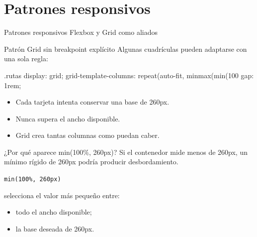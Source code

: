 \documentclass[aspectratio=169,11pt]{beamer}
\begin{document}
    \section{Patrones responsivos}

    \SectionSlide
    {Patrones responsivos}
    {Flexbox y Grid como aliados}

    \begin{frame}[fragile]{Patrón Grid sin breakpoint explícito}
        Algunas cuadrículas pueden adaptarse con una sola regla:

        \begin{csscodedark}
            .rutas {
                display: grid;
                grid-template-columns:
                repeat(auto-fit, minmax(min(100%
                gap: 1rem;
            }
        \end{csscodedark}

        \begin{itemize}
            \item Cada tarjeta intenta conservar una base de 260px.
            \item Nunca supera el ancho disponible.
            \item Grid crea tantas columnas como puedan caber.
        \end{itemize}
    \end{frame}

    \begin{frame}{¿Por qué aparece min(100\%, 260px)?}
        Si el contenedor mide menos de 260px, un mínimo rígido de 260px
        podría producir desbordamiento.

        \begin{center}
            \Large
            \texttt{min(100\%, 260px)}
        \end{center}

        selecciona el valor más pequeño entre:

        \begin{itemize}
            \item todo el ancho disponible;
            \item la base deseada de 260px.
        \end{itemize}

    \end{frame}
\end{document}
